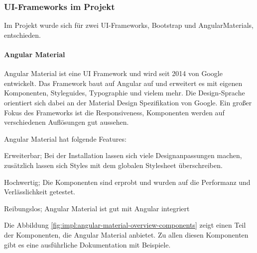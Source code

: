 \subsubsection{UI-Frameworks im Projekt}
Im Projekt wurde sich für zwei UI-Frameworks, Bootstrap und AngularMaterials, entschieden.


\paragraph{Angular Material}
Angular Material ist eine UI Framework und wird seit 2014 von Google entwickelt. Das Framework baut auf Angular auf und erweitert es mit eigenen Komponenten, Styleguides, Typographie und vielem mehr. Die Design-Sprache orientiert sich dabei an der Material Design Spezifikation von Google. Ein großer Fokus des Frameworks ist die Responsiveness, Komponenten werden auf verschiedenen Auflösungen gut aussehen.


Angular Material hat folgende Features:
\begin{compactitem}
    \item Erweiterbar; Bei der Installation lassen sich viele Designanpassungen machen, zusätzlich lassen sich Styles mit dem globalen Stylesheet überschreiben. 
    \item Hochwertig; Die Komponenten sind erprobt und wurden auf die Performanz und Verlässlichkeit getestet.
    \item Reibungslos; Angular Material ist gut mit Angular integriert
\end{compactitem}

Die Abbildung \ref{fig:impl:angular-material-overview-components} zeigt einen Teil der Komponenten, die Angular Material anbietet. Zu allen diesen Komponenten gibt es eine ausführliche Dokumentation mit Beispiele. 
\cite{JavaPointAngularMaterial}
\cite{WhatAngularMaterial}

